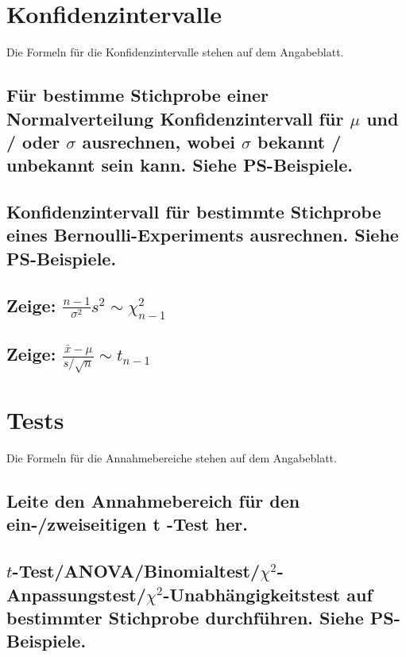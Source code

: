 \documentclass[a4paper,10pt]{article}
\begin{document}
\section{Konfidenzintervalle}
Die Formeln für die Konfidenzintervalle stehen auf dem Angabeblatt.

\subsection{Für be\-stimme Stich\-probe ein\-er Normal\-ver\-teil\-ung Kon\-fi\-denz\-in\-ter\-vall für $\mu$ und / oder $\sigma$ aus\-rechnen, wo\-bei $\sigma$ be\-kannt / un\-be\-kannt sein kann. Siehe PS-Bei\-spiele.}

\subsection{Konfidenz\-intervall für be\-stimmte Stich\-probe eines Bern\-oulli-\-Ex\-peri\-ments ausrechnen. Siehe PS-Bei\-spiele.}

\subsection{Zeige: $\frac{n-1}{\sigma^2} s^2 \sim \chi^{2}_{n-1}$}

\subsection{Zeige: $\frac{\bar{x} - \mu}{s/\sqrt{n}} \sim t_{n-1}$}

\newpage
\section{Tests}
Die Formeln für die Annahmebereiche stehen auf dem Angabeblatt.

\subsection{Leite den Annahmebereich für den ein-/zweiseitigen t -Test her.}

\subsection{$t$-Test/ANOVA/Binomial\-test/$\chi^2$-Anpassungs\-test/$\chi^2$-Unabhängigkeits\-test auf bestimmter Stich\-probe durchführen. Siehe PS-Beispiele.}
\end{document}
